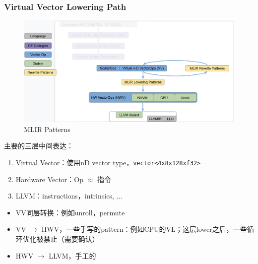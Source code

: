 \documentclass[aspectratio=169]{ctexbeamer}
\begin{document}
\begin{frame}
    \frametitle{Virtual Vector Lowering Path}
    \noindent
    \begin{minipage}[t]{0.50\linewidth}
        \begin{figure}
            \centering
            \includegraphics[width=1.0\linewidth]{images/position2.png}
            \caption{MLIR Patterns}
        \end{figure}
    \end{minipage}%
    \hfill%
    \begin{minipage}[t]{0.45\linewidth}
        主要的三层中间表达：
        \begin{enumerate}
            \item Virtual Vector：使用nD vector type，\texttt{vector<4x8x128xf32>}
            \item Hardware Vector：Op $\approx$ 指令
            \item LLVM：instructions，intrinsics, $\dots$
        \end{enumerate}

        \begin{itemize}
            \item VV同层转换：例如unroll，permute
            \item VV $\rightarrow$ HWV，一些手写的pattern：例如CPU的VL；这层lower之后，一些循环优化被禁止（需要确认）
            \item HWV $\rightarrow$ LLVM，手工的
        \end{itemize}
    \end{minipage}



\end{frame}
\end{document}
